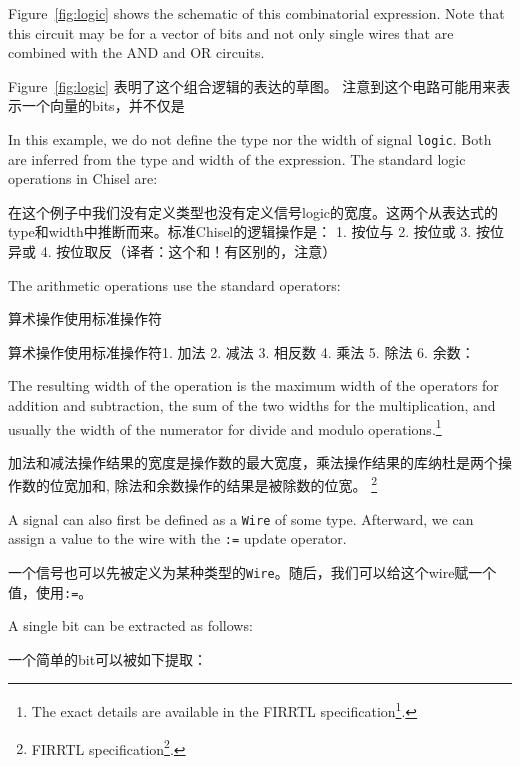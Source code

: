 \documentclass[%
    10pt,
    headinclude, footexclude,
    openright, %
    notitlepage,
    cleardoubleempty,
    headsepline,
    pointlessnumbers,
    bibtotoc, idxtotoc,
    ]{scrbook}
\newcommand{\code}[1]{{\small{\texttt{#1}}}}
\newcommand{\myref}[2]{\href{#1}{#2}}
\renewcommand{\myref}[2]{{#2}{\footnote{\url{#1}}}}
\begin{document}
Figure~\ref{fig:logic} shows the schematic of this combinatorial expression.
Note that this circuit may be for a vector of bits and not only single wires
that are combined with the AND and OR circuits.

Figure~\ref{fig:logic} 表明了这个组合逻辑的表达的草图。
注意到这个电路可能用来表示一个向量的bits，并不仅是

In this example, we do not define the type nor the width of signal \code{logic}.
Both are inferred from the type and width of the expression.
The standard logic operations in Chisel are:


在这个例子中我们没有定义类型也没有定义信号logic的宽度。这两个从表达式的type和width中推断而来。标准Chisel的逻辑操作是：
1. 按位与
2. 按位或
3. 按位异或
4. 按位取反（译者：这个和！有区别的，注意）

\noindent The arithmetic operations use the standard operators:

\noindent 算术操作使用标准操作符


算术操作使用标准操作符1. 加法 2. 减法 3. 相反数 4. 乘法 5. 除法 6. 余数：

\noindent The resulting width of the operation is the maximum width of the operators for
addition and subtraction, the sum of the two widths for the multiplication, and usually
the width of the numerator for divide and modulo operations.\footnote{The exact
details are available in the \myref{https://github.com/freechipsproject/firrtl/blob/master/spec/spec.pdf}{FIRRTL specification}.}

加法和减法操作结果的宽度是操作数的最大宽度，乘法操作结果的库纳杜是两个操作数的位宽加和, 除法和余数操作的结果是被除数的位宽。
\footnote{ \myref{https://github.com/freechipsproject/firrtl/blob/master/spec/spec.pdf}{FIRRTL specification}.}

A signal can also first be defined as a \code{Wire} of some type. Afterward, we can assign a
value to the wire with the \code{:=} update operator.

一个信号也可以先被定义为某种类型的\code{Wire}。随后，我们可以给这个wire赋一个值，使用\code{:=}。


A single bit can be extracted as follows:

一个简单的bit可以被如下提取：

\end{document}
